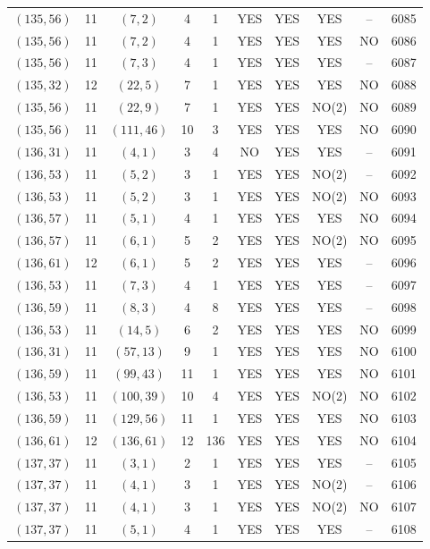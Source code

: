 \begin{longtable}{|c|c|c|c|c|c|c|c|c|c|}
$(135, 56)$ & 11 & $(7, 2)$ & 4 & 1 & YES & YES & YES & -- & 6085\\
$(135, 56)$ & 11 & $(7, 2)$ & 4 & 1 & YES & YES & YES & NO & 6086\\
$(135, 56)$ & 11 & $(7, 3)$ & 4 & 1 & YES & YES & YES & -- & 6087\\
$(135, 32)$ & 12 & $(22, 5)$ & 7 & 1 & YES & YES & YES & NO & 6088\\
$(135, 56)$ & 11 & $(22, 9)$ & 7 & 1 & YES & YES & NO(2) & NO & 6089\\
$(135, 56)$ & 11 & $(111, 46)$ & 10 & 3 & YES & YES & YES & NO & 6090\\
$(136, 31)$ & 11 & $(4, 1)$ & 3 & 4 & NO & YES & YES & -- & 6091\\
$(136, 53)$ & 11 & $(5, 2)$ & 3 & 1 & YES & YES & NO(2) & -- & 6092\\
$(136, 53)$ & 11 & $(5, 2)$ & 3 & 1 & YES & YES & NO(2) & NO & 6093\\
$(136, 57)$ & 11 & $(5, 1)$ & 4 & 1 & YES & YES & YES & NO & 6094\\
$(136, 57)$ & 11 & $(6, 1)$ & 5 & 2 & YES & YES & NO(2) & NO & 6095\\
$(136, 61)$ & 12 & $(6, 1)$ & 5 & 2 & YES & YES & YES & -- & 6096\\
$(136, 53)$ & 11 & $(7, 3)$ & 4 & 1 & YES & YES & YES & -- & 6097\\
$(136, 59)$ & 11 & $(8, 3)$ & 4 & 8 & YES & YES & YES & -- & 6098\\
$(136, 53)$ & 11 & $(14, 5)$ & 6 & 2 & YES & YES & YES & NO & 6099\\
$(136, 31)$ & 11 & $(57, 13)$ & 9 & 1 & YES & YES & YES & NO & 6100\\
$(136, 59)$ & 11 & $(99, 43)$ & 11 & 1 & YES & YES & YES & NO & 6101\\
$(136, 53)$ & 11 & $(100, 39)$ & 10 & 4 & YES & YES & NO(2) & NO & 6102\\
$(136, 59)$ & 11 & $(129, 56)$ & 11 & 1 & YES & YES & YES & NO & 6103\\
$(136, 61)$ & 12 & $(136, 61)$ & 12 & 136 & YES & YES & YES & NO & 6104\\
$(137, 37)$ & 11 & $(3, 1)$ & 2 & 1 & YES & YES & YES & -- & 6105\\
$(137, 37)$ & 11 & $(4, 1)$ & 3 & 1 & YES & YES & NO(2) & -- & 6106\\
$(137, 37)$ & 11 & $(4, 1)$ & 3 & 1 & YES & YES & NO(2) & NO & 6107\\
$(137, 37)$ & 11 & $(5, 1)$ & 4 & 1 & YES & YES & YES & -- & 6108\\

\end{longtable}
